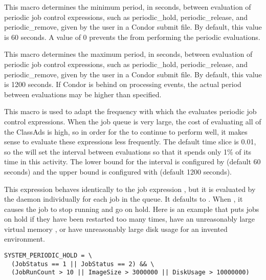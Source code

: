 \begin{description}
\label{param:PeriodicExprInterval}
\item[\Macro{PERIODIC\_EXPR\_INTERVAL}]
  This macro determines the minimum period,
  in seconds, between evaluation of periodic job control expressions,
  such as periodic\_hold, periodic\_release, and periodic\_remove,
  given by the user in a Condor submit file. By default, this value is
  60 seconds.  A value of 0 prevents the  from
  performing the periodic evaluations.

\label{param:MaxPeriodicExprInterval}
\item[\Macro{MAX\_PERIODIC\_EXPR\_INTERVAL}]
  This macro determines the maximum period,
  in seconds, between evaluation of periodic job control expressions,
  such as periodic\_hold, periodic\_release, and periodic\_remove,
  given by the user in a Condor submit file. By default, this value is
  1200 seconds.  If Condor is behind on processing events, the actual
  period between evaluations may be higher than specified.

\label{param:PeriodicExprTimeslice}
\item[\Macro{PERIODIC\_EXPR\_TIMESLICE}]
  This macro is used to adapt the
  frequency with which the  evaluates periodic job
  control expressions.  When the job queue is very large, the cost of
  evaluating all of the ClassAds is high, so in order for the
   to continue to perform well, it makes sense to
  evaluate these expressions less frequently.  The default time slice
  is 0.01, so the  will set the interval between
  evaluations so that it spends only 1\% of its time in this activity.
  The lower bound for the interval is configured by
   (default 60 seconds) and the
  upper bound is configured with 
  (default 1200 seconds).

\label{param:SystemPeriodicHold}
\item[\Macro{SYSTEM\_PERIODIC\_HOLD}]
  This expression behaves identically
  to the job expression , but it is evaluated by
  the  daemon individually for each job in the queue.
  It defaults to .
  When , it causes the job to stop running and go on hold.
  Here is an
  example that puts jobs on hold if they have been restarted too many
  times, have an unreasonably large virtual memory , or have
  unreasonably large disk usage for an invented environment.

\footnotesize
\begin{verbatim}
SYSTEM_PERIODIC_HOLD = \
  (JobStatus == 1 || JobStatus == 2) && \
  (JobRunCount > 10 || ImageSize > 3000000 || DiskUsage > 10000000)
\end{verbatim}
\normalsize


\end{description}
